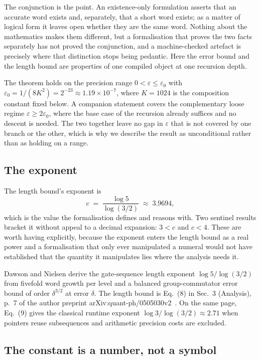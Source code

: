 \documentclass[aps,prx,nofootinbib,superscriptaddress,12pt]{revtex4-2}
\begin{document}
The conjunction is the point. An existence-only formulation asserts that
an accurate word exists and, separately, that a short word exists; as a
matter of logical form it leaves open whether they are the same word.
Nothing about the mathematics makes them different, but a formalisation
that proves the two facts separately has not proved the conjunction, and
a machine-checked artefact is precisely where that distinction stops
being pedantic. Here the error bound and the length bound are properties
of one compiled object at one recursion depth.

The theorem holds on the precision range $0 < \varepsilon \le
\varepsilon_0$ with $\varepsilon_0 = 1/(8 K^2) = 2^{-23} \approx
1.19 \times 10^{-7}$, where $K = 1024$ is the composition constant fixed
below. A companion statement covers the complementary loose regime
$\varepsilon \ge 2\varepsilon_0$, where the base case of the recursion
already suffices and no descent is needed. The two together leave no gap
in $\varepsilon$ that is not covered by one branch or the other, which
is why we describe the result as unconditional rather than as holding on
a range.

\subsection{The exponent}

The length bound's exponent is
\[
c \;=\; \frac{\log 5}{\log(3/2)} \;\approx\; 3.9694 ,
\]
which is the value the formalisation defines and reasons with. Two
sentinel results bracket it without appeal to a decimal expansion:
$3 < c$ and $c < 4$. These are worth having explicitly, because the
exponent enters the length bound as a real power and a formalisation
that only ever manipulated a numeral would not have established that the
quantity it manipulates lies where the analysis needs it.

Dawson and Nielsen derive the gate-sequence length exponent
$\log 5/\log(3/2)$ from fivefold word growth per level and a balanced
group-commutator error bound of order $\delta^{3/2}$ at error $\delta$.
The length bound is Eq.~(8) in Sec.~3 (Analysis), p.~7 of the author
preprint arXiv:quant-ph/0505030v2~\cite{DawsonNielsen2006}. On the same
page, Eq.~(9) gives the classical runtime exponent
$\log 3/\log(3/2) \approx 2.71$ when pointers reuse subsequences and
arithmetic precision costs are excluded.

\subsection{The constant is a number, not a symbol}
\end{document}
